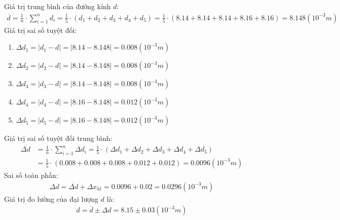\documentclass{article}
\begin{document}
Giá trị trung bình của đường kính $d$:
\begin{align*}
    \overline{d} = \frac{1}{n}\cdot\sum_{i = 1}^{n}d_i = \frac{1}{5}\cdot(d_1 + d_2 + d_3 + d_4 + d_5) = \frac{1}{5}\cdot(8.14 + 8.14 + 8.14 + 8.16 + 8.16) = 8.148(10^{-3} m)
\end{align*}
Giá trị sai số tuyệt đối:
\begin{enumerate}
    \item $\Delta d_1 = |d_1 - d| = |8.14 - 8.148| = 0.008(10^{-3} m)$
    \item $\Delta d_2 = |d_2 - d| = |8.14 - 8.148| = 0.008(10^{-3} m)$
    \item $\Delta d_3 = |d_3 - d| = |8.14 - 8.148| = 0.008(10^{-3} m)$
    \item $\Delta d_4 = |d_4 - d| = |8.16 - 8.148| = 0.012(10^{-3} m)$
    \item $\Delta d_5 = |d_5 - d| = |8.16 - 8.148| = 0.012(10^{-3} m)$
\end{enumerate}
Giá trị sai số tuyệt đối trung bình:
\begin{align*}
    \overline{\Delta d} &= \frac{1}{n}\cdot\sum_{i=1}^{n}\Delta d_i = \frac{1}{5}\cdot(\Delta d_1 + \Delta d_2 + \Delta d_3 + \Delta d_4 + \Delta d_5)\\ 
    &=  \frac{1}{5}\cdot(0.008 + 0.008 + 0.008 + 0.012 + 0.012) = 0.0096(10^{-3} m)
\end{align*}
Sai số toàn phần:
\begin{align*}
    \Delta d = \overline{\Delta d} + \Delta x_{ht} =0.0096 + 0.02 =0.0296(10^{-3} m) 
\end{align*}
Giá trị đo lường của đại lượng $d$ là:
\begin{align*}
    d = \overline{d} \pm \Delta d = 8.15 \pm 0.03(10^{-3} m)
\end{align*}
\end{document}
